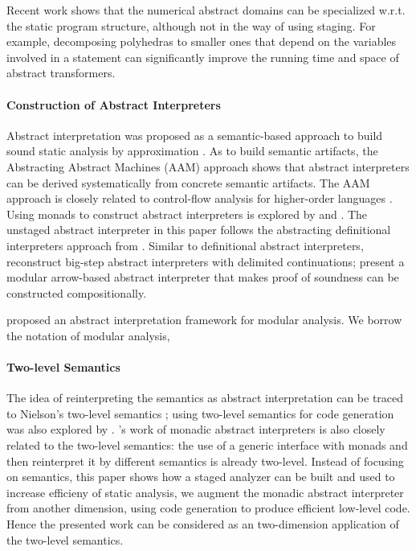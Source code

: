 Recent work shows that the numerical abstract domains can be
specialized w.r.t. the static program structure, although not in the
way of using staging. For example, decomposing polyhedras
\cite{DBLP:conf/popl/SinghPV17, Singh:2017:PCD:3177123.3158143} to
smaller ones that depend on the variables involved in a statement can
significantly improve the running time and space of abstract
transformers.

\paragraph{Construction of Abstract Interpreters} Abstract interpretation
was proposed as a semantic-based approach to build sound static analysis by
approximation \cite{DBLP:conf/popl/CousotC77}. As to build semantic
artifacts, the Abstracting Abstract Machines (AAM)
\cite{DBLP:journals/jfp/HornM12, DBLP:conf/icfp/HornM10} approach
shows that abstract interpreters can be derived systematically from
concrete semantic artifacts. The AAM approach is closely related to
control-flow analysis for higher-order languages
\cite{Midtgaard:2012:CAF:2187671.2187672}.  Using monads to construct
abstract interpreters is explored by
\citet{Sergey:2013:MAI:2491956.2491979} and
\citet{DBLP:journals/pacmpl/DaraisLNH17,
  Darais:2015:GTM:2814270.2814308}.  The unstaged abstract interpreter
in this paper follows the abstracting definitional interpreters
approach from \citet{DBLP:journals/pacmpl/DaraisLNH17}.  Similar to
definitional abstract interpreters,
\citet{Wei:2018:RAA:3243631.3236800} reconstruct big-step abstract
interpreters with delimited continuations;
\citet{Keidel:2018:CSP:3243631.3236767} present a modular arrow-based
abstract interpreter that makes proof of soundness can be constructed
compositionally.

\citet{DBLP:conf/cc/CousotC02} proposed an abstract interpretation
framework for modular analysis. We borrow the notation of modular
analysis, 

\paragraph{Two-level Semantics} The idea of reinterpreting the semantics as
abstract interpretation can be traced to Nielson's two-level semantics
\cite{NIELSON1989117}; using two-level semantics for code generation
was also explored by \citet{NIELSON198859}.
\citet{Sergey:2013:MAI:2491956.2491979}'s work of monadic abstract
interpreters is also closely related to the two-level semantics: the
use of a generic interface with monads and then reinterpret it by
different semantics is already two-level. Instead of focusing on
semantics, this paper shows how a staged analyzer can be built and
used to increase efficieny of static analysis, we augment the monadic
abstract interpreter from another dimension, using code generation to
produce efficient low-level code. Hence the presented work can be
considered as an two-dimension application of the two-level semantics.

